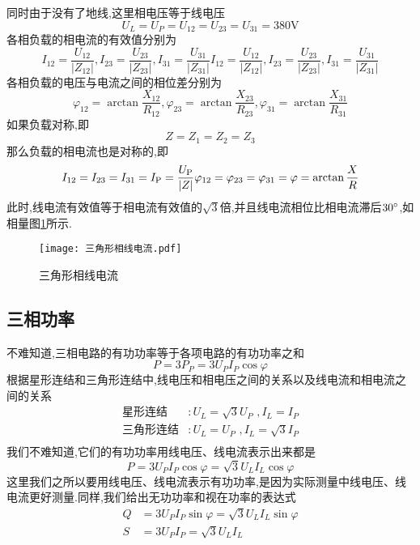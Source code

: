 \Par 同时由于没有了地线,这里相电压等于线电压
\begin{equation}
    U_L=U_P=U_{12}=U_{23}=U_{31}=380\mathrm{V}
\end{equation}
各相负载的相电流的有效值分别为
\begin{equation}
    I_{12}=\frac{U_{12}}{\left|Z_{12}\right|}, I_{23}=\frac{U_{23}}{\left|Z_{23}\right|}, I_{31}=\frac{U_{31}}{\left|Z_{31}\right|}I_{12}=\frac{U_{12}}{\left|Z_{12}\right|}, I_{23}=\frac{U_{23}}{\left|Z_{23}\right|}, I_{31}=\frac{U_{31}}{\left|Z_{31}\right|}
\end{equation}
各相负载的电压与电流之间的相位差分别为
\begin{equation}
    \varphi_{12}=\arctan \frac{X_{12}}{R_{12}}, \varphi_{23}=\arctan \frac{X_{23}}{R_{23}}, \varphi_{31}=\arctan \frac{X_{31}}{R_{31}}
\end{equation}
如果负载对称,即
\begin{equation}
    Z=Z_1=Z_2=Z_3
\end{equation}
那么负载的相电流也是对称的,即
\begin{equation}
    I_{12}=I_{23}=I_{31}=I_{\mathrm{P}}=\frac{U_{\mathrm{P}}}{|Z|}\\
    \varphi_{12}=\varphi_{23}=\varphi_{31}=\varphi=\arctan \frac{X}{R}
\end{equation}
此时,线电流有效值等于相电流有效值的$\sqrt{3}$倍,并且线电流相位比相电流滞后$30^{\circ } $,如相量图\ref{fig:相电流与线电流}所示.
\begin{figure}[htbp]
	\centering
	\texttt{[image: 三角形相线电流.pdf]}
	\caption{三角形相线电流}
	\label{fig:相电流与线电流}
\end{figure}

\subsection{\K 三相功率}

\Par 不难知道,三相电路的有功功率等于各项电路的有功功率之和
\begin{equation*}
    P=3P_P=3U_PI_P\cos \varphi 
\end{equation*}
根据星形连结和三角形连结中,线电压和相电压之间的关系以及线电流和相电流之间的关系
\begin{equation}
    \begin{aligned}
        \text{星形连结}&:U_L=\sqrt{3}U_P\,\, ,  I_L=I_P\\
        \text{三角形连结}&:U_L=U_P\,\, ,  I_L=\sqrt{3}I_P\\
    \end{aligned}
\end{equation}
我们不难知道,它们的有功功率用线电压、线电流表示出来都是
\begin{equation}
    P=3U_PI_P\cos \varphi =\sqrt{3}U_LI_L\cos \varphi 
\end{equation}
这里我们之所以要用线电压、线电流表示有功功率,是因为实际测量中线电压、线电流更好测量.同样,我们给出无功功率和视在功率的表达式
\begin{align}
    Q&=3U_PI_P\sin \varphi =\sqrt{3}U_LI_L\sin \varphi\\
    S&=3U_PI_P=\sqrt{3}U_LI_L
\end{align}